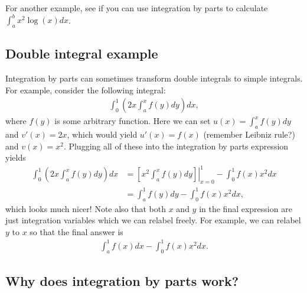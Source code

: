 \documentclass{article}
\begin{document}
For another example, see if you can use integration by parts to calculate $\int_a^b x^2 \log (x) dx$.


\subsection{Double integral example}

Integration by parts can sometimes transform double integrals to simple integrals. For example, consider the following integral:
\begin{align*}
	\int_0^1 \left(2x \int_a^x f(y) dy\right) dx,
\end{align*}
where $f(y)$ is some arbitrary function. Here we can set $u(x) = \int_a^x f(y) dy$ and $v'(x) = 2x$, which would yield $u'(x) = f(x)$ (remember Leibniz rule?) and $v(x) = x^2$. Plugging all of these into the integration by parts expression yields
\begin{align*}
	\int_0^1 \left(2x \int_a^x f(y) dy\right) dx &= \left.\left[ x^2 \int_a^x f(y)dy \right]\right|_{x=0}^1 - \int_0^1 f(x) x^2 dx
	\\
	&= \int_a^1 f(y) dy - \int_0^1 f(x) x^2 dx,
\end{align*}
which looks much nicer! Note also that both $x$ and $y$ in the final expression are just integration variables which we can relabel freely. For example, we can relabel $y$ to $x$ so that the final answer is
\begin{align*}
	\int_a^1 f(x) dx - \int_0^1 f(x) x^2 dx.
\end{align*}


\subsection{Why does integration by parts work?}
\end{document}
